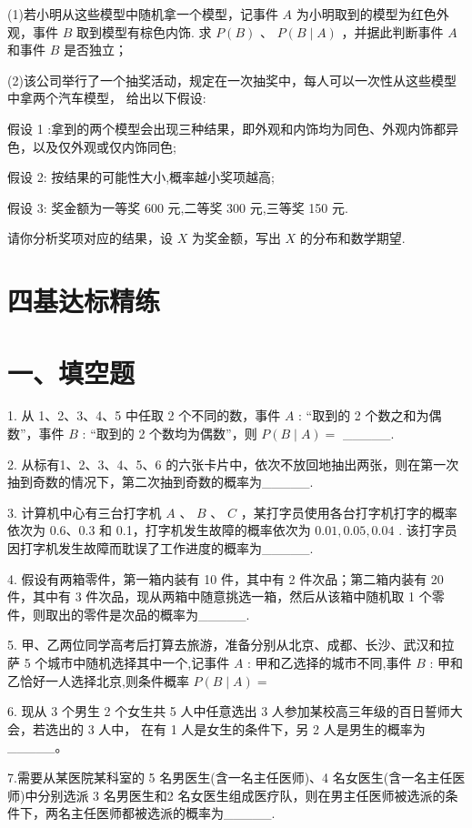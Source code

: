 (1)若小明从这些模型中随机拿一个模型，记事件 $A$ 为小明取到的模型为红色外观，事件 $B$ 取到模型有棕色内饰. 求 $P\left( B\right)$ 、 $P\left( {B \mid  A}\right)$ ，并据此判断事件 $A$ 和事件 $B$ 是否独立；

(2)该公司举行了一个抽奖活动，规定在一次抽奖中，每人可以一次性从这些模型中拿两个汽车模型， 给出以下假设:

假设 1 :拿到的两个模型会出现三种结果，即外观和内饰均为同色、外观内饰都异色，以及仅外观或仅内饰同色;

假设 2: 按结果的可能性大小,概率越小奖项越高;

假设 3: 奖金额为一等奖 600 元,二等奖 300 元,三等奖 150 元.

请你分析奖项对应的结果，设 $X$ 为奖金额，写出 $X$ 的分布和数学期望.

\section*{四基达标精练}

\section*{一、填空题}

1. 从 1、2、3、4、5 中任取 2 个不同的数，事件 $A$ : “取到的 2 个数之和为偶数”，事件 $B$ : “取到的 2 个数均为偶数”，则 $P\left( {B \mid  A}\right)  =$ \_\_\_\_\_.

2. 从标有1、2、3、4、5、6 的六张卡片中，依次不放回地抽出两张，则在第一次抽到奇数的情况下，第二次抽到奇数的概率为\_\_\_\_\_.

3. 计算机中心有三台打字机 $A$ 、 $B$ 、 $C$ ，某打字员使用各台打字机打字的概率依次为 0.6、0.3 和 0.1，打字机发生故障的概率依次为 ${0.01},{0.05},{0.04}$ . 该打字员因打字机发生故障而耽误了工作进度的概率为\_\_\_\_\_.

4. 假设有两箱零件，第一箱内装有 10 件，其中有 2 件次品；第二箱内装有 20 件，其中有 3 件次品，现从两箱中随意挑选一箱，然后从该箱中随机取 1 个零件，则取出的零件是次品的概率为\_\_\_\_\_.

5. 甲、乙两位同学高考后打算去旅游，准备分别从北京、成都、长沙、武汉和拉萨 5 个城市中随机选择其中一个,记事件 $A$ : 甲和乙选择的城市不同,事件 $B$ : 甲和乙恰好一人选择北京,则条件概率 $P\left( {B \mid  A}\right)  =$

6. 现从 3 个男生 2 个女生共 5 人中任意选出 3 人参加某校高三年级的百日誓师大会，若选出的 3 人中， 在有 1 人是女生的条件下，另 2 人是男生的概率为\_\_\_\_\_。

7.需要从某医院某科室的 5 名男医生(含一名主任医师)、4 名女医生(含一名主任医师)中分别选派 3 名男医生和2 名女医生组成医疗队，则在男主任医师被选派的条件下，两名主任医师都被选派的概率为\_\_\_\_\_.


